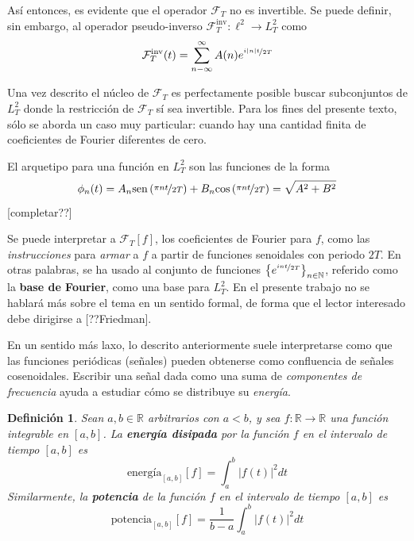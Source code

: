 \documentclass[12pt,letterpaper,draft]{book}
\newtheorem{definicion}{Definición}[chapter]
\newcommand{\R}{\mathbb{R}}
\newcommand{\N}{\mathbb{N}}
\newcommand{\COS}[1]{\mathrm{cos}\left( #1 \right)}
\newcommand{\SEN}[1]{\mathrm{sen}\left( #1 \right)}
\newcommand{\abso}[1]{\left| #1 \right|}
\begin{document}
Así entonces, es evidente que el operador $\mathcal{F}_T$ no es invertible.
%
Se puede definir, sin embargo, al operador pseudo-inverso $\mathcal{F}_{T}^{\text{inv}} : \ell^{2} \rightarrow L^{2}_T$ como
\begin{equation}
\mathcal{F}_{T}^{\text{inv}}(t) = \sum_{n -\infty}^{\infty} A(n) e^{\nicefrac{i \abso{n} t}{2 T}}
\end{equation}

Una vez descrito el núcleo de $\mathcal{F}_{T}$ es perfectamente posible buscar subconjuntos de $L^{2}_T$ donde la restricción de $\mathcal{F}_{T}$ sí sea invertible.
%
Para los fines del presente texto, sólo se aborda un caso muy particular: cuando hay una cantidad finita de coeficientes de Fourier diferentes de cero.

El arquetipo para una función en $L^{2}_T$ son las funciones de la forma
\begin{equation}
\phi_n(t) = A_n \SEN{\nicefrac{\pi n t }{2T}} + B_n \COS{\nicefrac{\pi n t }{2T}}
= \sqrt{A^{2}+B^{2}} 
\end{equation}
[completar??]

Se puede interpretar a $\mathcal{F}_{T}[f]$, los coeficientes de Fourier para $f$, como las \textit{instrucciones} para \textit{armar} a $f$ a partir de funciones senoidales con periodo $2T$.
%
En otras palabras, se ha usado al conjunto de funciones $\left\{ e^{\nicefrac{i {n} t}{2 T}} \right\}_{n\in \N}$, referido como la \textbf{base de Fourier}, como una base para $L^{2}_T$.
%
En el presente trabajo no se hablará más sobre el tema en un sentido formal, de forma que el lector interesado debe dirigirse a [??Friedman].

En un sentido más laxo, lo descrito anteriormente suele interpretarse como que las funciones periódicas (señales) pueden obtenerse como confluencia de señales cosenoidales.
%
Escribir una señal dada como una suma de \textit{componentes de frecuencia} ayuda a estudiar cómo se distribuye su \textit{energía}.

\begin{definicion}
Sean $a,b \in \R$ arbitrarios con $a<b$, y sea $f: \R \rightarrow \R$ una función integrable en $[a,b]$. La \textbf{energía disipada} por la función $f$ en el intervalo de tiempo $[a,b]$ es
\begin{equation}
\text{energía}_{[a,b]}[f] = \int_a^{b} \abso{f(t)}^{2} dt
\end{equation}
Similarmente, la \textbf{potencia} de la función $f$ en el intervalo de tiempo $[a,b]$ es
\begin{equation}
\text{potencia}_{[a,b]}[f] = \frac{1}{b-a} \int_a^{b} \abso{f(t)}^{2} dt
\end{equation}
\end{definicion}
\end{document}
